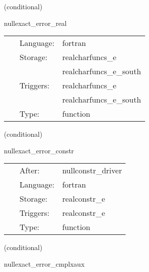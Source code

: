    (conditional) 

\hspace{5mm} nullexact\_error\_real 

\hspace{5mm}{\it error in characteristic evolution variables } 


\hspace{5mm}

 \begin{tabular*}{160mm}{cll} 
~ & Language:  & fortran \\ 
~ & Storage:  & realcharfuncs\_e \\ 
~& ~ &realcharfuncs\_e\_south\\ 
~ & Triggers:  & realcharfuncs\_e \\ 
~& ~ &realcharfuncs\_e\_south\\ 
~ & Type:  & function \\ 
\end{tabular*} 


\vspace{5mm}

   (conditional) 

\hspace{5mm} nullexact\_error\_constr 

\hspace{5mm}{\it error in constraints } 


\hspace{5mm}

 \begin{tabular*}{160mm}{cll} 
~ & After:  & nullconstr\_driver \\ 
~ & Language:  & fortran \\ 
~ & Storage:  & realconstr\_e \\ 
~ & Triggers:  & realconstr\_e \\ 
~ & Type:  & function \\ 
\end{tabular*} 


\vspace{5mm}

   (conditional) 

\hspace{5mm} nullexact\_error\_cmplxaux 

\hspace{5mm}{\it error in characteristic evolution variables } 


\hspace{5mm}

